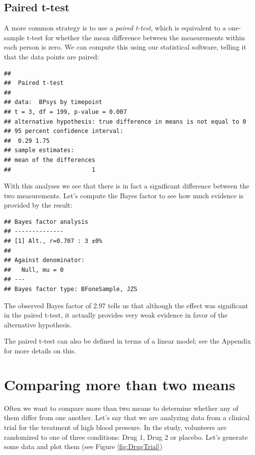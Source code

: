 \documentclass[12pt,]{book}
\theoremstyle{definition}
\theoremstyle{definition}
\theoremstyle{definition}
\theoremstyle{remark}
\begin{document}
\hypertarget{paired-t-test}{%
\subsection{Paired t-test}\label{paired-t-test}}

A more common strategy is to use a \emph{paired t-test}, which is equivalent to a one-sample t-test for whether the mean difference between the measurements within each person is zero. We can compute this using our statistical software, telling it that the data points are paired:

\begin{verbatim}
## 
##  Paired t-test
## 
## data:  BPsys by timepoint
## t = 3, df = 199, p-value = 0.007
## alternative hypothesis: true difference in means is not equal to 0
## 95 percent confidence interval:
##  0.29 1.75
## sample estimates:
## mean of the differences 
##                       1
\end{verbatim}

With this analyses we see that there is in fact a significant difference between the two measurements. Let's compute the Bayes factor to see how much evidence is provided by the result:

\begin{verbatim}
## Bayes factor analysis
## --------------
## [1] Alt., r=0.707 : 3 ±0%
## 
## Against denominator:
##   Null, mu = 0 
## ---
## Bayes factor type: BFoneSample, JZS
\end{verbatim}

The observed Bayes factor of 2.97 tells us that although the effect was significant in the paired t-test, it actually provides very weak evidence in favor of the alternative hypothesis.

The paired t-test can also be defined in terms of a linear model; see the Appendix for more details on this.

\hypertarget{comparing-more-than-two-means}{%
\section{Comparing more than two means}\label{comparing-more-than-two-means}}

Often we want to compare more than two means to determine whether any of them differ from one another. Let's say that we are analyzing data from a clinical trial for the treatment of high blood pressure. In the study, volunteers are randomized to one of three conditions: Drug 1, Drug 2 or placebo. Let's generate some data and plot them (see Figure \ref{fig:DrugTrial})
\end{document}
